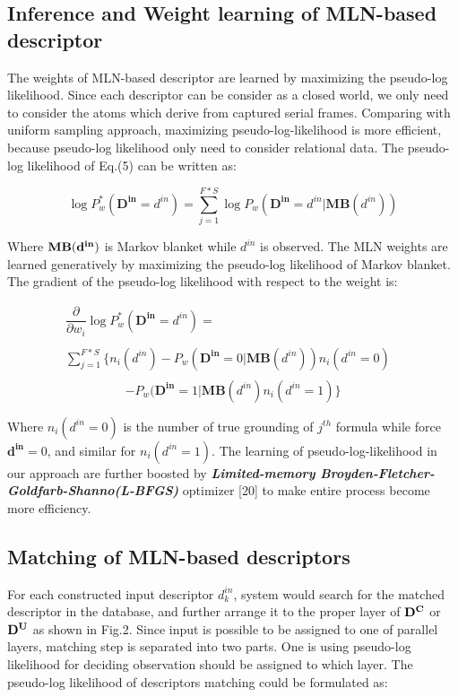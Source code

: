 \documentclass{tADR2e}
\begin{document}
\subsection{Inference and Weight learning of MLN-based descriptor}
The weights of MLN-based descriptor are learned by maximizing the pseudo-log likelihood. Since each descriptor can be consider as a closed world, we only need to consider the atoms which derive from captured serial frames. Comparing with uniform sampling approach, maximizing pseudo-log-likelihood is more efficient, because pseudo-log likelihood only need to consider relational data. The pseudo-log likelihood of Eq.(5) can be written as:

\begin{equation}
\log P^*_w(\mathbf{D^{in}} = d^{in}) = \sum_{j=1}^{F*S} \log P_{w}(\mathbf{D^{in}} = d^{in}|\mathbf{MB}(d^{in}))
\end{equation}

Where $\bf{MB}(d^{in})$ is Markov blanket while $d^{in}$ is observed. The MLN weights are learned generatively by maximizing the pseudo-log likelihood of Markov blanket. The gradient of the pseudo-log likelihood with respect to the weight is:

\begin{displaymath}
\begin{array}{ll}
\dfrac{\partial}{\partial w_i}\log P^*_w(\mathbf{D^{in}} = d^{in})= &\\\\
\sum^{F*S}_{j=1}\{n_i(d^{in})-P_w(\mathbf{D^{in}}=0|\mathbf{MB}(d^{in}))n_i(d^{in}=0) &\\
\end{array}
\end{displaymath}
\begin{equation}
-P_w(\mathbf{D^{in}}=1|\mathbf{MB}(d^{in})n_i(d^{in}=1)\}
\end{equation}

Where $n_i(d^{in}=0)$ is the number of true grounding of $j^{th}$ formula while force $\mathbf{d^{in}}=0$, and similar for $n_i(d^{in}=1)$. The learning of pseudo-log-likelihood in our approach are further boosted by  \textbf{\textit{Limited-memory Broyden-Fletcher-Goldfarb-Shanno(L-BFGS)}} optimizer [20] to make entire process become more efficiency.

\subsection{Matching of MLN-based descriptors}
For each constructed input descriptor $d^{in}_k$, system would search for the matched descriptor in the database, and further arrange it to the proper layer of $\bf{D^C}$ or $\bf{D^U}$ as shown in Fig.2. Since input is possible to be assigned to one of parallel layers, matching step is separated into two parts. One is using pseudo-log likelihood for deciding observation should be assigned to which layer. The pseudo-log likelihood of descriptors matching could be formulated as:
\end{document}
